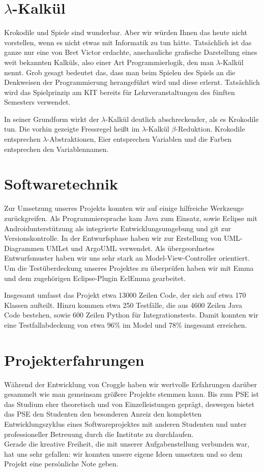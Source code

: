 \documentclass{scrartcl}
\begin{document}
	\section{$\lambda$-Kalkül}
	Krokodile und Spiele sind wunderbar.
	Aber wir würden Ihnen das heute nicht vorstellen, wenn es nicht etwas mit Informatik zu tun hätte.
	Tatsächlich ist das ganze nur eine von Bret Victor erdachte, anschauliche grafische Darstellung eines weit bekannten Kalküls, also einer Art Programmierlogik, den man $\lambda$-Kalkül nennt.
	Grob gesagt bedeutet das, dass man beim Spielen des Spiels an die Denkweisen der Programmierung herangeführt wird und diese erlernt.
	Tatsächlich wird das Spielprinzip am KIT bereits für Lehrveranstaltungen des fünften Semesters verwendet.

	In seiner Grundform wirkt der $\lambda$-Kalkül deutlich abschreckender, als es Krokodile tun.
	Die vorhin gezeigte Fressregel heißt im $\lambda$-Kalkül $\beta$-Reduktion.
	Krokodile entsprechen $\lambda$-Abstraktionen, Eier entsprechen Variablen und die Farben entsprechen den Variablennamen.

	\section{Softwaretechnik}
	Zur Umsetzung unseres Projekts konnten wir auf einige hilfreiche Werkzeuge zurückgreifen.
	Als Programmiersprache kam Java zum Einsatz, sowie Eclipse mit Androidunterstützung als integrierte Entwicklungsumgebung und git zur Versionskontrolle.
	In der Entwurfsphase haben wir zur Erstellung von UML-Diagrammen UMLet und ArgoUML verwendet.
	Als übergeordnetes Entwurfsmuster haben wir uns sehr stark an Model-View-Controller orientiert.
	Um die Testüberdeckung unseres Projektes zu überprüfen haben wir mit Emma und dem zugehörigen Eclipse-Plugin EclEmma gearbeitet.

	Insgesamt umfasst das Projekt etwa 13000 Zeilen Code, der sich auf etwa 170 Klassen aufteilt.
	Hinzu kommen etwa 250 Testfälle, die aus 4600 Zeilen Java Code bestehen, sowie 600 Zeilen Python für Integrationstests.
	Damit konnten wir eine Testfallabdeckung von etwa 96\% im Model und 78\% insgesamt erreichen.

	\section{Projekterfahrungen}

	Während der Entwicklung von Croggle haben wir wertvolle Erfahrungen darüber gesammelt wie man gemeinsam größere Projekte stemmen kann. Bis zum PSE ist das Studium eher theoretisch und von Einzelleistungen geprägt, deswegen bietet das PSE den Studenten den besonderen Anreiz den kompletten Entwicklungszyklus eines Softwareprojektes mit anderen Studenten und unter professioneller Betreuung durch die Institute zu durchlaufen. \\
	Gerade die kreative Freiheit, die mit unserer Aufgabenstellung verbunden war, hat uns sehr gefallen: wir konnten unsere eigene Ideen umsetzen und so dem Projekt eine persönliche Note geben. \\
\end{document}
